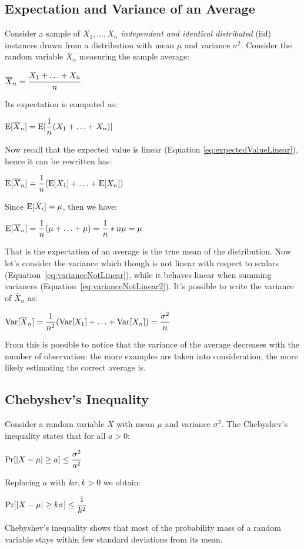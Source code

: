\subsection{Expectation and Variance of an Average}
Consider a sample of $X_1,\hdots, X_n$ \textit{independent and identical distributed} (iid) instances drawn from a distribution with mean $\mu$ and variance $\sigma^2$. \newline
Consider the random variable $\overline{X}_n$ measuring the sample average:
\begin{center}
	$\displaystyle \overline{X}_n=\cfrac{X_1+\hdots+X_n}{n}$
\end{center}
Its expectation is computed as:
\begin{center}
	$\displaystyle \text{E}[\overline{X}_n]=\text{E}[\frac{1}{n}(X_1+\hdots+X_n)]$
\end{center}
Now recall that the expected value is linear (Equation \ref{eq:expectedValueLinear}), hence it can be rewritten has:
\begin{center}
	$\displaystyle \text{E}[\overline{X}_n]=\frac{1}{n}(\text{E}[X_1]+\hdots+\text{E}[X_n])$
\end{center}
Since $\text{E}[X_i]=\mu$, then we have:
\begin{center}
	$\displaystyle \text{E}[\overline{X}_n]=\frac{1}{n}(\mu+\hdots+\mu)=\frac{1}{n}*n\mu=\mu$
\end{center}
That is the expectation of an average is the true mean of the distribution. \newline
Now let's consider the variance which though is not linear with respect to scalars (Equation~\ref{eq:varianceNotLinear}), while it behaves linear when summing variances (Equation~\ref{eq:varianceNotLinear2}). It's possible to write the variance of $\overline{X}_n$ as:
\begin{center}
	$\displaystyle \text{Var}[\overline{X}_n]=\frac{1}{n^2}(\text{Var}[X_1]+\hdots+\text{Var}[X_n])=\frac{\sigma^2}{n}$
\end{center}
From this is possible to notice that the variance of the average decreases with the number of observation: the more examples are taken into consideration, the more likely estimating the correct average is. 
%
%
\subsection{Chebyshev's Inequality}
Consider a random variable $X$ with mean $\mu$ and variance $\sigma^2$. The Chebyshev's inequality states that for all $a>0$:
\begin{center}
	$\displaystyle \text{Pr}[\vert X-\mu \vert\geq a]\leq\frac{\sigma^2}{a^2}$
\end{center}
Replacing $a$ with $k\sigma, k>0$ we obtain:
\begin{center}
	$\displaystyle \text{Pr}[\vert X-\mu \vert\geq k\sigma]\leq\frac{1}{k^2}$
\end{center}
Chebyshev's inequality shows that most of the probability mass of a random variable stays within few standard deviations from its mean. 
%
%
